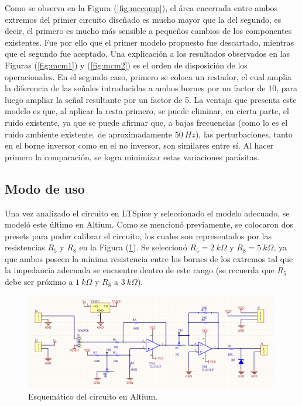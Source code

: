 \documentclass[a4paper]{article}
\begin{document}
Como se observa en la Figura (\ref{fig:mccomp}), el área encerrada entre ambos extremos del primer circuito diseñado es mucho mayor que la del segundo, es decir, el primero es mucho más sensible a pequeños cambios de los componentes existentes. Fue por ello que el primer modelo propuesto fue descartado, mientras que el segundo fue aceptado. 
Una explicación a los resultados observados en las Figuras (\ref{fig:mcm1}) y (\ref{fig:mcm2}) es el orden de disposición de los operacionales. En el segundo caso, primero se coloca un restador, el cual amplia la diferencia de las señales introducidas a ambos bornes por un factor de 10, para luego ampliar la señal resultante por un factor de 5. La ventaja que presenta este modelo es que, al aplicar la resta primero, se puede eliminar, en cierta parte, el ruido existente, ya que se puede afirmar que, a bajas frecuencias (como lo es el ruido ambiente existente, de aproximadamente $50 \ Hz$), las perturbaciones, tanto en el borne inversor como en el no inversor, son similares entre sí. Al hacer primero la comparación, se logra minimizar estas variaciones parásitas.

\subsection{Modo de uso}

Una vez analizado el circuito en LTSpice y seleccionado el modelo adecuado, se modeló este último en Altium. Como se mencionó previamente, se colocaron dos presets para poder calibrar el circuito, los cuales son representados por las resistencias $R_5$ y $R_8$ en la Figura (\ref{fig:schematic}). Se seleccionó $R_5 = 2 \ k\Omega$ y $R_8 = 5 \ k\Omega$, ya que ambos poseen la mínima resistencia entre los bornes de los extremos tal que la impedancia adecuada se encuentre dentro de este rango (se recuerda que $R_5$ debe ser próximo a $ 1 \ k\Omega$ y $R_8$ a $ 3 \ k\Omega$).

\begin{figure}[H]
	\centering
	\includegraphics[width=0.99\textwidth]{Ejercicio6/Imagenes/Schematic.png}
	\caption{Esquemático del circuito en Altium.}
	\label{fig:schematic}
\end{figure}
\end{document}
